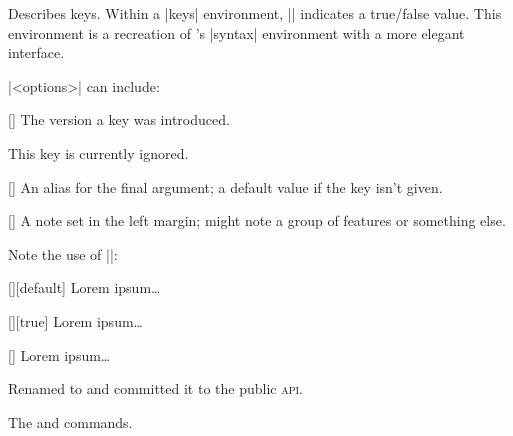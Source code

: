 \documentclass{ltxguidex}
\begin{document}
Describes keys. Within a |keys| environment, |\bool| indicates a true/false
value. This environment is a recreation of 's |syntax|
environment with a more elegant interface.

|<options>| can include:

\begin{keys}
	[]
	The version a key was introduced.

	\begin{warning}
		This key is currently ignored.
	\end{warning}

	[]
	An alias for the final argument; a default value if the key isn't
	given.

	[]
	A note set in the left margin; might note a group of features or
	something else.
\end{keys}

\begin{example}
	Note the use of |\bool|:
\begin{LTXexample}
\begin{keys}
      [][default]
  Lorem ipsum\dots

  [\bool][true]
  Lorem ipsum\dots

  []
  Lorem ipsum\dots
\end{keys}
\end{LTXexample}
\end{example}

\begin{changelog}[author=Rebecca Turner]
\begin{version}[v=0.1.1, date=2019-04-15]
\added
	\item Renamed  to  and committed
	it to the public \textsc{api}.
	\item The  and  commands.
\end{version}
\end{changelog}
\end{document}
